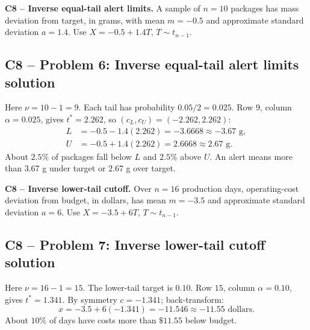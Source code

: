 {
\textbf{C8 -- Inverse equal-tail alert limits.} A sample of $n=10$ packages has mass deviation from target, in grams, with mean $m=-0.5$ and approximate standard deviation $a=1.4$. Use $X=-0.5+1.4T$, $T\sim t_{n-1}$.
\label{sol:q6}
\subsection*{C8 -- Problem 6: Inverse equal-tail alert limits solution }
Here $\nu=10-1=9$. Each tail has probability $0.05/2=0.025$.
Row $9$, column $\alpha=0.025$, gives $t^*=2.262$, so $(c_L,c_U)=(-2.262,2.262)$:
\[
 \begin{aligned}
 L&=-0.5-1.4(2.262)=-3.6668\approx\boxed{-3.67\text{ g}},\\
 U&=-0.5+1.4(2.262)=2.6668\approx\boxed{2.67\text{ g}}.
 \end{aligned}
\]
About $2.5\%$ of packages fall below $L$ and $2.5\%$ above $U$.
An alert means more than $3.67$ g under target or $2.67$ g over target.
\secInicio[sec:q6]
}

{
\textbf{C8 -- Inverse lower-tail cutoff.} Over $n=16$ production days, operating-cost deviation from budget, in dollars, has mean $m=-3.5$ and approximate standard deviation $a=6$. Use $X=-3.5+6T$, $T\sim t_{n-1}$.
\label{sol:q7}
\subsection*{C8 -- Problem 7: Inverse lower-tail cutoff solution }
Here $\nu=16-1=15$. The lower-tail target is $0.10$.
Row $15$, column $\alpha=0.10$, gives $t^*=1.341$.
By symmetry $c=-1.341$; back-transform:
\[
 x=-3.5+6(-1.341)=-11.546\approx\boxed{-11.55\text{ dollars}}.
\]
About $10\%$ of days have costs more than $\$11.55$ below budget.
\secInicio[sec:q7]
}

